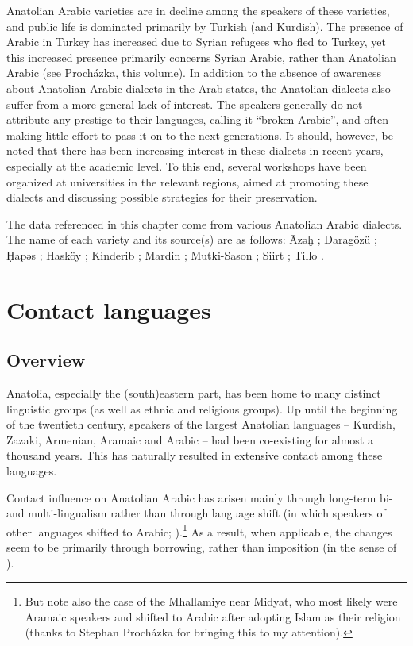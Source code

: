 \documentclass[output=paper]{langsci/langscibook}
\begin{document}
Anatolian Arabic varieties are in decline among the speakers of these varieties, and public life is dominated primarily by Turkish (and Kurdish). The presence of Arabic in Turkey has increased due to Syrian refugees who fled to Turkey, yet this increased presence primarily concerns Syrian Arabic, rather than Anatolian Arabic (see Proch\'{a}zka, this volume). In addition to the absence of awareness about Anatolian Arabic dialects in the Arab states, the Anatolian dialects also suffer from a more general lack of interest. The speakers generally do not attribute any prestige to their languages, calling it ``broken Arabic'', and often making little effort to pass it on to the next generations. It should, however, be noted that there has been increasing interest in these dialects in recent years, especially at the academic level. To this end, several workshops have been organized at universities in the relevant regions, aimed at promoting these dialects and discussing possible strategies for their preservation.  

The data referenced in this chapter come from various Anatolian Arabic dialects. The name of each variety and its source(s) are as follows: \={A}zəḫ \citep{Wittrich2001}; Darag\"{o}z\"{u} \citep{Jastrow1973}; \d{H}apəs \citep{Talay2007}; Hask\"{o}y \citep{Talay2001,Talay2002}; Kinderib \citep{Jastrow1978};  Mardin  \citep{Jastrow2006,Grigore2007article,GrigoreBituna2012}; Mutki-Sason \citep{Akkus2016,Akkus2017,Isaksson2005}; Siirt \citep{Bituna2016,GrigoreBituna2012}; Tillo \citep{Lahdo2009}.

\section{Contact languages}

\subsection{Overview}
Anatolia, especially the (south)eastern part, has been home to many distinct linguistic groups (as well as ethnic and religious groups). Up until the beginning of the twentieth century, speakers of the largest Anatolian languages -- Kurdish, Zazaki, Armenian, Aramaic and Arabic -- had been co-existing for almost a thousand years. This has naturally resulted in extensive contact among these languages.  

Contact influence on Anatolian Arabic has arisen mainly through long-term bi- and multi-lingualism rather than through language shift (in which speakers of other languages shifted to Arabic; \citealt{Thomason2001}).\footnote{But note also the case of the Mhallamiye near Midyat, who most likely were Aramaic speakers and shifted to Arabic after adopting Islam as their religion (thanks to Stephan Procházka for bringing this to my attention).} As a result, when applicable, the changes seem to be primarily through borrowing, rather than imposition (in the sense of \citealt{VanCoetsem1988,VanCoetsem2000}). 
\end{document}
